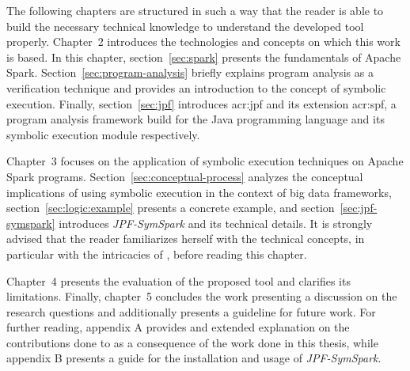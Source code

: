 The following chapters are structured in such a way that the reader is able to build the necessary technical knowledge to understand the developed tool properly. Chapter~2 introduces the technologies and concepts on which this work is based. In this chapter, section~\ref{sec:spark} presents the fundamentals of Apache Spark. Section~\ref{sec:program-analysis} briefly explains program analysis as a verification technique and provides an introduction to the concept of symbolic execution. Finally, section~\ref{sec:jpf} introduces \acrlong{acr:jpf} and its extension \acrlong{acr:spf}, a program analysis framework build for the Java programming language and its symbolic execution module respectively.

Chapter~3 focuses on the application of symbolic execution techniques on Apache Spark programs. Section~\ref{sec:conceptual-process} analyzes the conceptual implications of using symbolic execution in the context of big data frameworks, section~\ref{sec:logic:example} presents a concrete example, and section~\ref{sec:jpf-symspark} introduces \textit{JPF-SymSpark} and its technical details. It is strongly advised that the reader familiarizes herself with the technical concepts, in particular with the intricacies of \jpf{}, before reading this chapter.

Chapter~4 presents the evaluation of the proposed tool and clarifies its limitations. Finally, chapter~5 concludes the work presenting a discussion on the research questions and additionally presents a guideline for future work. For further reading, appendix A provides and extended explanation on the contributions done to \spf{} as a consequence of the work done in this thesis, while appendix B presents a guide for the installation and usage of \textit{JPF-SymSpark}.

 
